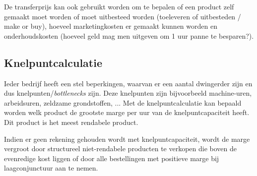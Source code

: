 \documentclass[../../samenvatting.tex]{subfiles}
\begin{document}
De transferprijs kan ook gebruikt worden om te bepalen of een product zelf gemaakt moet worden of moet uitbesteed worden (toeleveren of uitbesteden / make or buy), hoeveel marketingkosten er gemaakt kunnen worden en onderhoudskosten (hoeveel geld mag men uitgeven om 1 uur panne te besparen?).

\subsection{Knelpuntcalculatie}
Ieder bedrijf heeft een stel beperkingen, waarvan er een aantal dwingerder zijn en dus knelpunten/\emph{bottlenecks} zijn. Deze knelpunten zijn bijvoorbeeld machine-uren, arbeidsuren, zeldzame grondstoffen, ... Met de knelpuntcalculatie kan bepaald worden welk product de grootste marge per uur van de knelpuntcapaciteit heeft. Dit product is het meest rendabele product.

Indien er geen rekening gehouden wordt met knelpuntcapaciteit, wordt de marge vergroot door structureel niet-rendabele producten te verkopen die boven de evenredige kost liggen of door alle bestellingen met positieve marge bij laagconjunctuur aan te nemen. 
\end{document}
